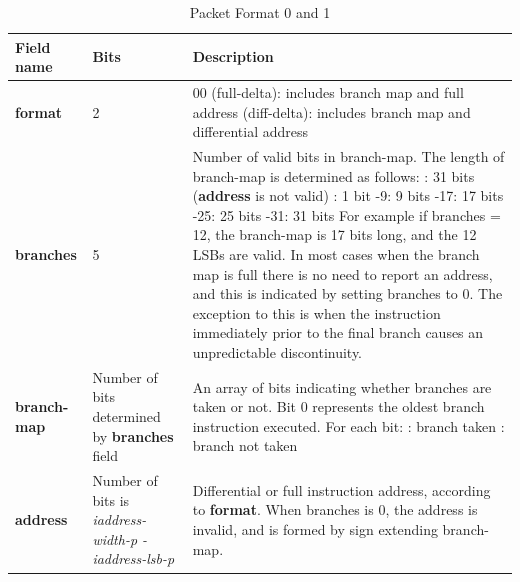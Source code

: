 \begin{table}[htp]
    \centering
    \caption{Packet Format 0 and 1}
    \label{tab:te_inst0-1}
    \begin{tabulary}{\textwidth}{|l|p{35mm}|p{80mm}|}
        \hline
        {\bf Field name} & {\bf Bits} & {\bf Description} \\
        \hline
        \textbf{format}	& 2	& 00 (full-delta): includes branch map and full address  (diff-delta): includes branch map and differential address\\
        \hline
        \textbf{branches} & 5 & Number of valid bits in branch-map. The length of branch-map is determined as follows: :      31 bits (\textbf{address} is not valid) : 	1 bit -9: 	9 bits -17: 	17 bits -25: 	25 bits -31: 	31 bits \newline
        For example if branches = 12, the branch-map is 17 bits long, and the 12 LSBs are valid. \newline
        In most cases when the branch map is full there is no need to report an address,
        and this is indicated by setting branches to 0.  The exception to this is when 
        the instruction immediately prior to the final branch causes an unpredictable discontinuity.\\
        \hline
        \textbf{branch-map} & Number of bits \newline 
                     determined by \newline 
                     \textbf {branches} field & 
                     An array of bits indicating whether branches are taken or not.\newline
        Bit 0 represents the oldest branch instruction executed.   For each bit: : branch taken : branch not taken \\
        \hline
        \textbf{address}	& Number of bits \newline 
                  is \textit {iaddress-width-p - iaddress-lsb-p} & 
                    Differential or full instruction address, according to \textbf {format}.  \newline
                    When branches is 0, the address is invalid, and is formed by sign extending branch-map.\\
        \hline
    \end{tabulary}
\end{table}


